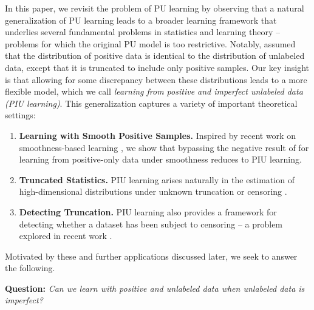\documentclass[11pt]{article}
\theoremstyle{plain}
\theoremstyle{definition}
\theoremstyle{remark}
\begin{document}
     In this paper, we revisit the problem of PU learning by observing that a natural generalization of PU learning leads to a broader learning framework that underlies several fundamental problems in statistics and learning theory -- problems for which the original PU model is too restrictive. Notably, \citet{denis1990positive} assumed that the distribution of positive data is identical to the distribution of unlabeled data, except that it is truncated to include only positive samples. Our key insight is that allowing for some discrepancy between these distributions leads to a more flexible model, which we call \textit{learning from positive and imperfect unlabeled data (PIU learning)}. This generalization captures a variety of important theoretical settings:
     \vspace{-1.5mm}
     \begin{enumerate}[leftmargin=15pt,itemsep=-3pt]
     \item[$\blacktriangleright$] \textbf{Learning with Smooth Positive Samples.} Inspired by recent work on smoothness-based learning \cite{haghtalab2020smooth, haghtalab2021smooth, pmlr-v247-chandrasekaran24a, blanchard2024agnostic}, we show that bypassing the negative result of \citet{natarajan1987learning} for learning from positive-only data under smoothness reduces to PIU learning.
     
     \item[$\blacktriangleright$] \textbf{Truncated Statistics.} PIU learning arises naturally in the estimation of high-dimensional distributions under unknown truncation or censoring \cite{daskalakis2018efficient, Kontonis2019EfficientTS}.


     \item[$\blacktriangleright$] \textbf{Detecting Truncation.} PIU learning also provides a framework for detecting whether a dataset has been subject to censoring -- a problem explored in recent work \cite{de2023detectingConvex, de2024detecting}.

     \end{enumerate}
     \vspace{-2mm}

    \noindent Motivated by these and further applications discussed later, we seek to answer the following.

    \vspace{1mm}
    
     \begin{mdframed}[skipbelow=0pt,skipabove=4pt]
       \textbf{Question:} \textit{Can we learn with positive and unlabeled data when unlabeled data is imperfect?}
     \end{mdframed}
     
\end{document}

